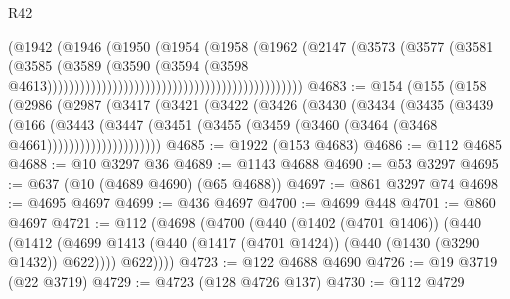 \begin{lexlean}{R42}
\begin{coremodule}
                                                                    (@1942
                                                                      (@1946
                                                                        (@1950
                                                                          (@1954
                                                                            (@1958
                                                                              (@1962
                                                                                (@2147
                                                                                  (@3573
                                                                                    (@3577
                                                                                      (@3581
                                                                                        (@3585
                                                                                          (@3589
                                                                                            (@3590
                                                                                              (@3594
                                                                                                (@3598
                                                                                                  @4613)))))))))))))))))))))))))))))))))))))))))))))))
@4683 := @154
    (@155
      (@158
        (@2986
          (@2987
            (@3417
              (@3421
                (@3422
                  (@3426
                    (@3430
                      (@3434
                        (@3435
                          (@3439
                            (@166
                              (@3443
                                (@3447
                                  (@3451
                                    (@3455 (@3459 (@3460 (@3464 (@3468 @4661)))))))))))))))))))))
@4685 := @1922 (@153 @4683)
@4686 := @112 @4685
@4688 := @10 @3297 @36
@4689 := @1143 @4688
@4690 := @53 @3297
@4695 := @637 (@10 (@4689 @4690) (@65 @4688))
@4697 := @861 @3297 @74
@4698 := @4695 @4697
@4699 := @436 @4697
@4700 := @4699 @448
@4701 := @860 @4697
@4721 := @112
    (@4698
      (@4700
        (@440
          (@1402 (@4701 @1406))
          (@440
            (@1412 (@4699 @1413 (@440 (@1417 (@4701 @1424)) (@440 (@1430 (@3290 @1432)) @622))))
            @622))))
@4723 := @122 @4688 @4690
@4726 := @19 @3719 (@22 @3719)
@4729 := @4723 (@128 @4726 @137)
@4730 := @112 @4729

\end{coremodule}
\end{lexlean}
